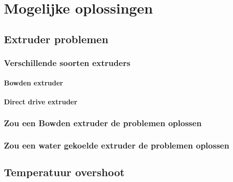 \chapter{Mogelijke oplossingen}
\label{Mogelijke_oplossingen}

\section{Extruder problemen}



\subsection{Verschillende soorten extruders}



\subsubsection{Bowden extruder}
\label{ss:Bowden_extruder}



\subsubsection{Direct drive extruder}
\label{ss:direct_drive_extruder}



\subsection{Zou een Bowden extruder de problemen oplossen}



\subsection{Zou een water gekoelde extruder de problemen oplossen}



\section{Temperatuur overshoot}


